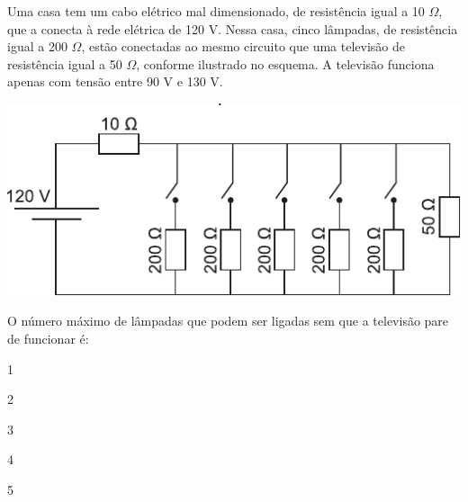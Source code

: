 \questao
Uma casa tem um cabo elétrico mal dimensionado, de resistência igual a 10 $\Omega$, que a conecta à rede elétrica de 120 V. Nessa casa, cinco lâmpadas, de resistência igual a 200 $\Omega$, estão conectadas ao mesmo circuito que uma televisão de resistência igual a 50 $\Omega$, conforme ilustrado no esquema. A televisão funciona apenas com tensão entre 90 V e 130 V.
\begin{center}
\includegraphics[width=\columnwidth]{subareas/ciencias_natureza/fisica-3.pdf}
\end{center}
O número máximo de lâmpadas que podem ser ligadas sem que a televisão pare de funcionar é:
\begin{alternativas}
\item 1
\item 2
\item 3
\item 4
\item 5
\end{alternativas}

